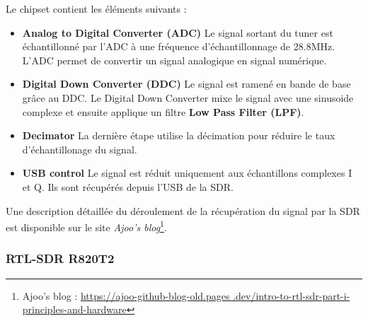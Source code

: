 \vspace{0.1cm}

Le chipset contient les éléments suivants :
\begin{itemize}
\item \textbf{Analog to Digital Converter (ADC)} Le signal sortant du tuner est échantillonné par l'ADC à une fréquence d'échantillonnage de 28.8MHz. L'ADC permet de convertir un signal analogique en signal numérique.
\item \textbf{Digital Down Converter (DDC)} Le signal est ramené en bande de base grâce au DDC. Le Digital Down Converter  mixe le signal avec une sinusoide complexe et ensuite applique un filtre \textbf{Low Pass Filter (LPF)}. 
\item \textbf{Decimator} La dernière étape utilise la décimation pour réduire le taux d'échantillonage du signal.
\item \textbf{USB control} Le signal est réduit uniquement aux échantillons complexes I et Q. Ils sont récupérés depuis l'USB de la SDR.
\end{itemize}

\vspace{0.1cm}

Une description détaillée du déroulement de la récupération du signal par la SDR est disponible sur le site \textit{Ajoo's blog}\footnote{Ajoo's blog : \href{https://ajoo-github-blog-old.pages.dev/intro-to-rtl-sdr-part-i-principles-and-hardware}{https://ajoo-github-blog-old.pages
.dev/intro-to-rtl-sdr-part-i-principles-and-hardware}}.




\subsubsection{RTL-SDR R820T2}

